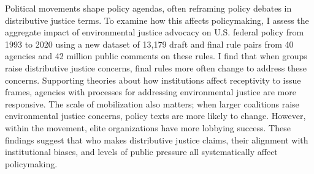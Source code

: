 Political movements shape policy agendas, often reframing policy debates in distributive justice terms.  To examine how this affects policymaking, I assess the aggregate impact of environmental justice advocacy on U.S. federal policy from 1993 to 2020 using a new dataset of 13,179 draft and final rule pairs from 40 agencies and 42 million public comments on these rules. I find that when groups raise distributive justice concerns, final rules more often change to address these concerns. Supporting theories about how institutions affect receptivity to issue frames, agencies with processes for addressing environmental justice are more responsive. The scale of mobilization also matters; when larger coalitions raise environmental justice concerns, policy texts are more likely to change. However, within the movement, elite organizations have more lobbying success. These findings suggest that who makes distributive justice claims, their alignment with institutional biases, and levels of public pressure all systematically affect policymaking.
